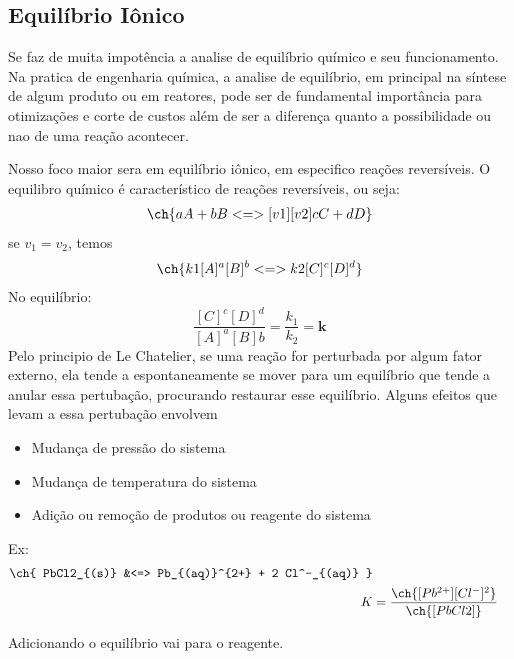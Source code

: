  \subsection{Equilíbrio Iônico}
 Se faz de muita impotência a analise de equilíbrio químico e seu funcionamento. Na pratica de
 engenharia química, a analise de equilíbrio, em principal na síntese de algum produto ou em
 reatores, pode ser de fundamental importância para otimizações e corte de custos além de ser a
 diferença quanto a possibilidade ou nao de uma reação acontecer. \par

 Nosso foco maior sera em equilíbrio iônico, em especifico reações reversíveis. O equilibro químico
 é característico de reações reversíveis, ou seja:
 \begin{align}
 \ch{
 aA + bB <=> [v1][v2] cC + dD}
 \end{align}
 se \(v_1=v_2\), temos
 \begin{align}
     \ch{k1 [A]^a [B]^b <=> k2 [C]^c [D]^d}
 \end{align}
 No equilíbrio:
 \begin{equation}
     \frac{[C]^c[D]^d}{[A]^a[B]b}=\frac{k_1}{k_2}=\mathbf{k}
 \end{equation}
 Pelo principio de Le Chatelier, se uma reação for perturbada por algum fator externo, ela tende a
 espontaneamente se mover para um equilíbrio que tende a anular essa pertubação, procurando
 restaurar esse equilíbrio. Alguns efeitos que levam a essa pertubação envolvem
 \begin{itemize}
     \item Mudança de pressão do sistema
     \item Mudança de temperatura do sistema
     \item Adição ou remoção de produtos ou reagente do sistema
 \end{itemize}
 Ex:
 \begin{align}
     \ch{
     PbCl2_{(s)} &<=> Pb_{(aq)}^{2+} +  2 Cl^-_{(aq)}
     }\\
     K&=\frac{\ch{[Pb^{2+}][Cl^-]^2}}{\ch{[PbCl2]}}
 \end{align}
 
 Adicionando  o equilíbrio vai para o reagente.
 
